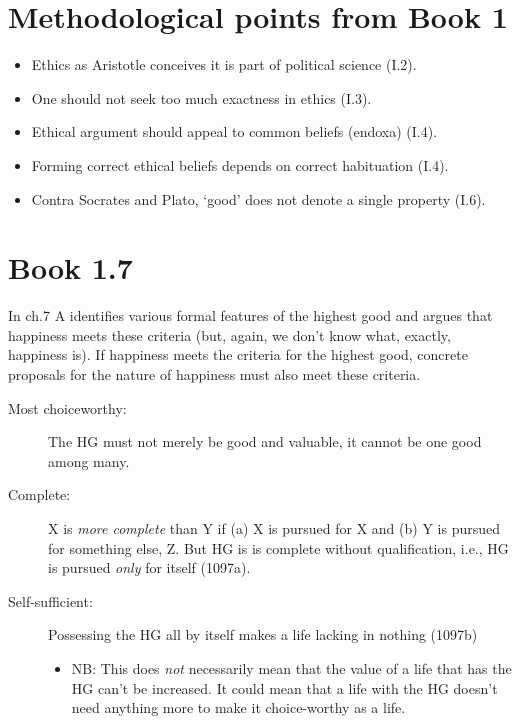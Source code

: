 \documentclass[oneside]{article}
\begin{document}




\section*{Methodological points from Book 1}

\begin{itemize}
\item Ethics as Aristotle conceives it is part of political science (I.2).
\item One should not seek too much exactness in ethics (I.3).
\item Ethical argument should appeal to common beliefs (endoxa) (I.4).
\item Forming correct ethical beliefs depends on correct habituation (I.4).
\item Contra Socrates and Plato, `good' does not denote a single property (I.6).
\end{itemize}


\section*{Book 1.7}

In ch.7 A identifies various formal features of the highest good and argues that happiness meets these criteria (but, again, we don't know what, exactly, happiness is). If happiness meets the criteria for the highest good, concrete proposals for the nature of happiness must also meet these criteria. 

\begin{description}
\item[Most choiceworthy:] The HG must not merely be good and valuable, it cannot be one good among many.
\item[Complete:]  X is \emph{more complete} than Y if (a) X is pursued for X and (b) Y is pursued for something else, Z. But HG is is complete without qualification, i.e., HG is pursued \emph{only} for itself (1097a).
\item[Self-sufficient:] Possessing the HG all by itself makes a life lacking in nothing (1097b)
\begin{itemize}
\item NB: This does \emph{not} necessarily mean that the value of a life that has the HG can't be increased. It could mean that a life with the HG doesn't need anything more to make it choice-worthy as a life.
\end{itemize}
\end{description}
\end{document}

